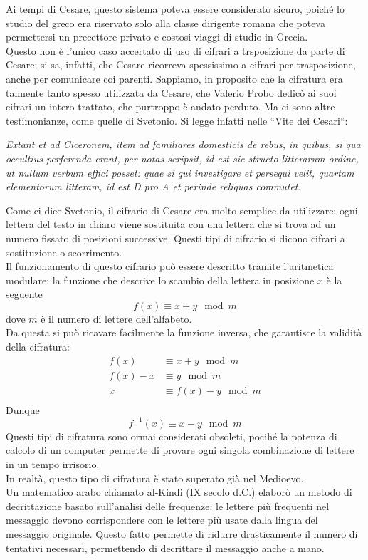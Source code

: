 \documentclass[italian,A4,12pt]{article}
\begin{document}
    Ai tempi di Cesare, questo sistema poteva essere considerato sicuro, poiché lo studio del greco era riservato solo alla classe dirigente romana che poteva permettersi un precettore
    privato e costosi viaggi di studio in Grecia.\\
    Questo non è l’unico caso accertato di uso di cifrari a trsposizione da parte di Cesare; si sa, infatti, che Cesare ricorreva spessissimo a cifrari per trasposizione, anche per comunicare coi parenti. Sappiamo, in proposito che la cifratura era talmente tanto spesso utilizzata da Cesare, che Valerio Probo dedicò ai suoi cifrari un intero trattato, che purtroppo è andato perduto. Ma ci sono altre testimonianze, come quelle di Svetonio. Si legge infatti nelle “Vite dei Cesari“:
    \begin{displayquote}
      \textit{Extant et ad Ciceronem, item ad familiares domesticis de rebus, in quibus, si qua occultius perferenda erant, per notas scripsit, id est sic structo litterarum ordine, ut nullum verbum effici posset: quae si qui investigare et persequi velit, quartam elementorum litteram, id est D pro A et perinde reliquas commutet.\\}
    \end{displayquote}
    Come ci dice Svetonio, il cifrario di Cesare era molto semplice da utilizzare: ogni lettera del testo in chiaro viene sostituita con una lettera che si trova ad un numero fissato di posizioni successive. Questi tipi di cifrario si dicono cifrari a sostituzione o scorrimento.\\
    Il funzionamento di questo cifrario può essere descritto tramite l'aritmetica modulare: la funzione che descrive lo scambio della lettera in posizione $x$ è la seguente
    $$f(x)\equiv x+y \mod{m}$$
    dove $m$ è il numero di lettere dell'alfabeto.\\
    Da questa si può ricavare facilmente la funzione inversa, che garantisce la validità della cifratura:
    \begin{align*}
      f(x) & \equiv x+y \mod{m}\\
      f(x)-x & \equiv y \mod{m}\\
      x & \equiv f(x)-y \mod{m}\\
    \end{align*}
    Dunque
    $$f^{-1}(x)\equiv x-y \mod{m}$$
    Questi tipi di cifratura sono ormai considerati obsoleti, pocihé la potenza di calcolo di un computer permette di provare ogni singola combinazione di lettere in un tempo irrisorio.\\
    In realtà, questo tipo di cifratura è stato superato già nel Medioevo. \\ Un matematico arabo chiamato al-Kindi (IX secolo d.C.) elaborò un metodo di decrittazione basato sull'analisi delle frequenze: le lettere più frequenti nel messaggio devono corrispondere con le lettere più usate dalla lingua del messaggio originale. Questo fatto permette di ridurre drasticamente il numero di tentativi necessari, permettendo di decrittare il messaggio anche a mano.
    \newpage
\end{document}
